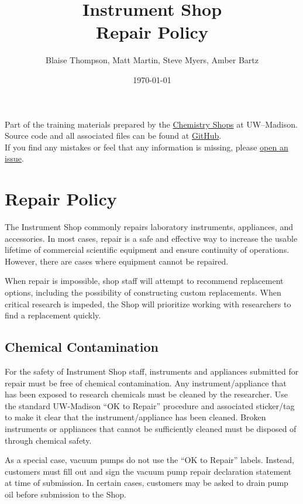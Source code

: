 \documentclass{training}
\title{Instrument Shop \\ Repair Policy}
\date{\today}
\author{Blaise Thompson, Matt Martin, Steve Myers, Amber Bartz}
\begin{document}
\maketitle
\renewcommand{\baselinestretch}{0.5}\normalsize
\tableofcontents
\renewcommand{\baselinestretch}{1.0}\normalsize
\vfill

Part of the training materials prepared by the \href{https://shops.chem.wisc.edu/}{Chemistry Shops} at UW--Madison. \\
Source code and all associated files can be found at \href{https://github.com/uw-madison-chem-shops/training}{GitHub}. \\
If you find any mistakes or feel that any information is missing, please \href{https://github.com/uw-madison-chem-shops/training/issues}{open an issue}. \\

\clearpage

\section{Repair Policy}

The Instrument Shop commonly repairs laboratory instruments, appliances, and accessories.
In most cases, repair is a safe and effective way to increase the usable lifetime of commercial scientific equipment and ensure continuity of operations.
However, there are cases where equipment cannot be repaired.

When repair is impossible, shop staff will attempt to recommend replacement options, including the possibility of constructing custom replacements.
When critical research is impeded, the Shop will prioritize working with researchers to find a replacement quickly.

\subsection{Chemical Contamination}

For the safety of Instrument Shop staff, instruments and appliances submitted for repair must be free of chemical contamination.
Any instrument/appliance that has been exposed to research chemicals must be cleaned by the researcher.
Use the standard UW-Madison “OK to Repair” procedure and associated sticker/tag to make it clear that the instrument/appliance has been cleaned.
Broken instruments or appliances that cannot be sufficiently cleaned must be disposed of through chemical safety.

As a special case, vacuum pumps do not use the “OK to Repair” labels.
Instead, customers must fill out and sign the vacuum pump repair declaration statement at time of submission.
In certain cases, customers may be asked to drain pump oil before submission to the Shop.
\end{document}

